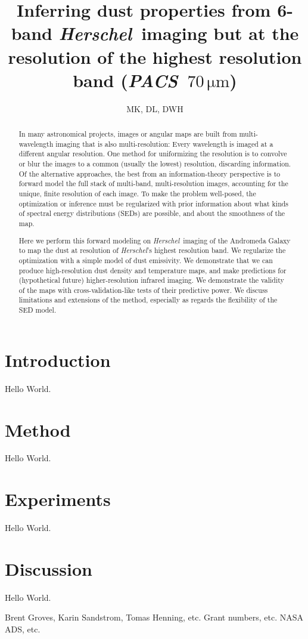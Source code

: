\documentclass[12pt, preprint]{aastex}
\newcommand{\project}[1]{\textsl{#1}}
\newcommand{\Herschel}{\project{Herschel}}
\newcommand{\PACS}{\project{PACS}}
\newcommand{\unit}[1]{{\mathrm{#1}}}
\newcommand{\mum}{\unit{\mu m}}
\begin{document}
\title{Inferring dust properties from 6-band \Herschel\ imaging
       but at the resolution of the highest resolution band (\PACS~$70\,\mum$)}
\author{MK, DL, DWH}

\begin{abstract}
In many astronomical projects, images or angular maps are built from
multi-wavelength imaging that is also multi-resolution:
Every wavelength is imaged at a different angular resolution.
One method for uniformizing the resolution is to convolve or blur the
images to a common (usually the lowest) resolution, discarding
information.
Of the alternative approaches, the best from an information-theory
perspective is to forward model the full stack of multi-band,
multi-resolution images, accounting for the unique, finite resolution
of each image.
To make the problem well-posed, the optimization or inference must be
regularized with prior information about what kinds of spectral energy
distributions (SEDs) are possible, and about the smoothness of the map.

Here we perform this forward modeling on \Herschel\ imaging of the
Andromeda Galaxy to map the dust at resolution of \Herschel's highest
resolution band.
We regularize the optimization with a simple model of dust emissivity.
We demonstrate that we can produce high-resolution dust density and
temperature maps, and make predictions for (hypothetical future)
higher-resolution infrared imaging.
We demonstrate the validity of the maps with cross-validation-like
tests of their predictive power.
We discuss limitations and extensions of the method, especially as
regards the flexibility of the SED model.
\end{abstract}

\section{Introduction}

Hello World.

\section{Method}

Hello World.

\section{Experiments}

Hello World.

\section{Discussion}

Hello World.

\acknowledgements
Brent Groves, Karin Sandstrom, Tomas Henning, etc.
Grant numbers, etc.
NASA ADS, etc.
\end{document}
